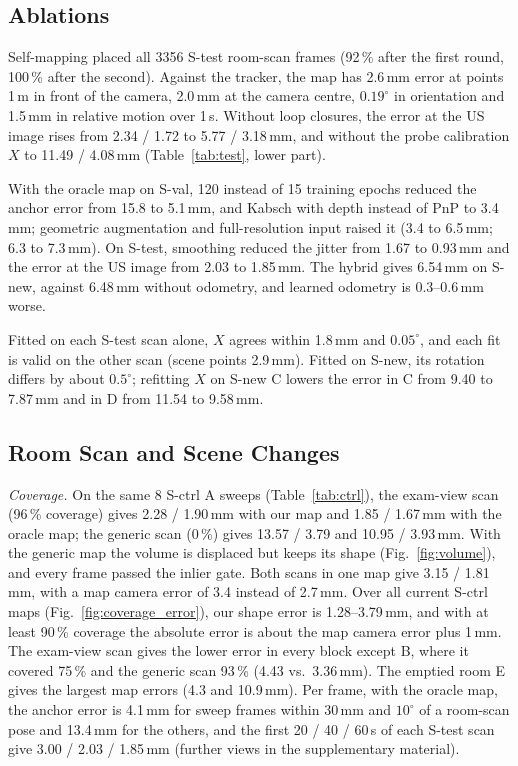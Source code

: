 \documentclass[9pt,shortpaper,twoside,web]{ieeecolor2}
\newcommand{\Sval}{S-val}
\newcommand{\Stest}{S-test}
\newcommand{\Snew}{S-new}
\newcommand{\Sctrl}{S-ctrl}
\begin{document}
\subsection{Ablations}
\label{sec:res_ablation}\label{sec:res_mapping}\label{sec:res_tracking}\label{sec:res_calib}
Self-mapping placed all 3356 \Stest{} room-scan frames (92\,\% after the first round, 100\,\% after the second). Against the tracker, the map has 2.6\,mm error at points 1\,m in front of the camera, 2.0\,mm at the camera centre, $0.19^\circ$ in orientation and 1.5\,mm in relative motion over 1\,s. Without loop closures, the error at the US image rises from 2.34 / 1.72 to 5.77 / 3.18\,mm, and without the probe calibration $X$ to 11.49 / 4.08\,mm (Table~\ref{tab:test}, lower part).

With the oracle map on \Sval{}, 120 instead of 15 training epochs reduced the anchor error from 15.8 to 5.1\,mm, and Kabsch with depth instead of PnP to 3.4\,mm; geometric augmentation and full-resolution input raised it (3.4 to 6.5\,mm; 6.3 to 7.3\,mm). On \Stest{}, smoothing reduced the jitter from 1.67 to 0.93\,mm and the error at the US image from 2.03 to 1.85\,mm. The hybrid gives 6.54\,mm on \Snew{}, against 6.48\,mm without odometry, and learned odometry is 0.3--0.6\,mm worse.

Fitted on each \Stest{} scan alone, $X$ agrees within 1.8\,mm and $0.05^\circ$, and each fit is valid on the other scan (scene points 2.9\,mm). Fitted on \Snew{}, its rotation differs by about $0.5^\circ$; refitting $X$ on \Snew{} C lowers the error in C from 9.40 to 7.87\,mm and in D from 11.54 to 9.58\,mm.

\subsection{Room Scan and Scene Changes}
\label{sec:res_coverage}\label{sec:res_changes}
\emph{Coverage.} On the same 8 \Sctrl{} A sweeps (Table~\ref{tab:ctrl}), the exam-view scan (96\,\% coverage) gives 2.28 / 1.90\,mm with our map and 1.85 / 1.67\,mm with the oracle map; the generic scan (0\,\%) gives 13.57 / 3.79 and 10.95 / 3.93\,mm. With the generic map the volume is displaced but keeps its shape (Fig.~\ref{fig:volume}), and every frame passed the inlier gate. Both scans in one map give 3.15 / 1.81\,mm, with a map camera error of 3.4 instead of 2.7\,mm. Over all current \Sctrl{} maps (Fig.~\ref{fig:coverage_error}), our shape error is 1.28--3.79\,mm, and with at least 90\,\% coverage the absolute error is about the map camera error plus 1\,mm. The exam-view scan gives the lower error in every block except B, where it covered 75\,\% and the generic scan 93\,\% (4.43 vs.\ 3.36\,mm). The emptied room E gives the largest map errors (4.3 and 10.9\,mm). Per frame, with the oracle map, the anchor error is 4.1\,mm for sweep frames within 30\,mm and $10^\circ$ of a room-scan pose and 13.4\,mm for the others, and the first 20 / 40 / 60\,s of each \Stest{} scan give 3.00 / 2.03 / 1.85\,mm (further views in the supplementary material).
\end{document}
